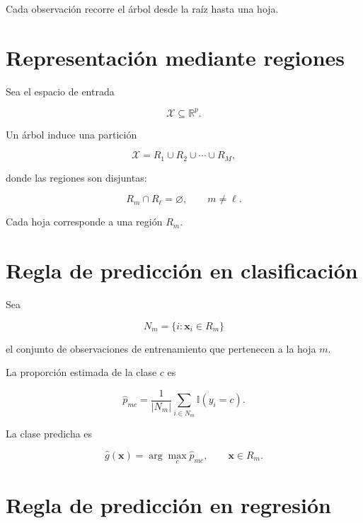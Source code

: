 \documentclass[
  spanish,
  10.5pt,
  letterpaper,
  DIV=11,
  numbers=noendperiod,
  oneside,
  open=any]{scrreprt}
\theoremstyle{definition}
\theoremstyle{definition}
\theoremstyle{plain}
\theoremstyle{remark}
\begin{document}
Cada observación recorre el árbol desde la raíz hasta una hoja.

\section*{Representación mediante
regiones}\label{representaciuxf3n-mediante-regiones}


Sea el espacio de entrada

\[
\mathcal{X}\subseteq\mathbb{R}^p.
\]

Un árbol induce una partición

\[
\mathcal{X}
=
R_1\cup R_2\cup\cdots\cup R_M,
\]

donde las regiones son disjuntas:

\[
R_m\cap R_\ell=\varnothing,
\qquad m\neq \ell.
\]

Cada hoja corresponde a una región \(R_m\).

\section*{Regla de predicción en
clasificación}\label{regla-de-predicciuxf3n-en-clasificaciuxf3n}


Sea

\[
N_m
=
\{i:\mathbf{x}_i\in R_m\}
\]

el conjunto de observaciones de entrenamiento que pertenecen a la hoja
\(m\).

La proporción estimada de la clase \(c\) es

\[
\widehat{p}_{mc}
=
\frac{1}{|N_m|}
\sum_{i\in N_m}
\mathbb{I}(y_i=c).
\]

La clase predicha es

\[
\widehat{g}(\mathbf{x})
=
\arg\max_c \widehat{p}_{mc},
\qquad
\mathbf{x}\in R_m.
\]

\section*{Regla de predicción en
regresión}\label{regla-de-predicciuxf3n-en-regresiuxf3n}

\end{document}

